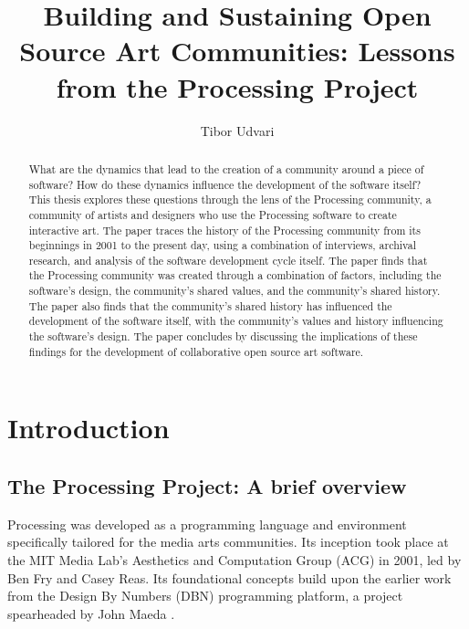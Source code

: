 \documentclass{article}
\title{Building and Sustaining Open Source Art Communities: Lessons from the Processing Project}
\author{Tibor Udvari}
\begin{document}
\maketitle

\begin{abstract}
What are the dynamics that lead to the creation of a community around a piece of software? How do these dynamics influence the development of the software itself? This thesis explores these questions through the lens of the Processing community, a community of artists and designers who use the Processing software to create interactive art. The paper traces the history of the Processing community from its beginnings in 2001 to the present day, using a combination of interviews, archival research, and analysis of the software development cycle itself. The paper finds that the Processing community was created through a combination of factors, including the software's design, the community's shared values, and the community's shared history. The paper also finds that the community's shared history has influenced the development of the software itself, with the community's values and history influencing the software's design. The paper concludes by discussing the implications of these findings for the development of collaborative open source art software.
\end{abstract}

\newpage

\section{Introduction}

\subsection{The Processing Project: A brief overview}

Processing was developed as a programming language and environment specifically tailored for the media arts communities. Its inception took place at the MIT Media Lab's Aesthetics and Computation Group (ACG) in 2001, led by Ben Fry and Casey Reas. Its foundational concepts build upon the earlier work from the Design By Numbers (DBN) programming platform, a project spearheaded by John Maeda \parencite{fryModernPrometheusHistory2018}.
\end{document}
